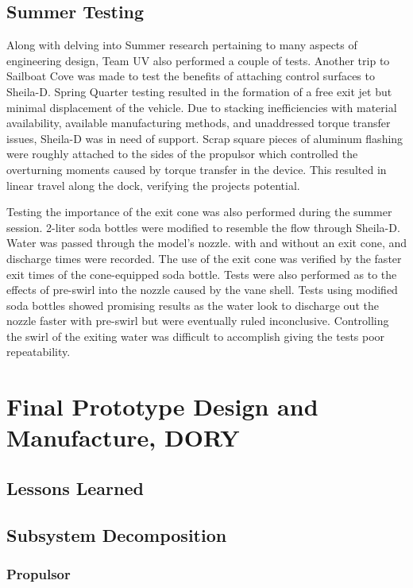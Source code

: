\documentclass{report}
\begin{document}
\section{Summer Testing}
Along with delving into Summer research pertaining to many aspects of engineering design, Team UV also performed a couple of tests.  Another trip to Sailboat Cove was made to test the benefits of attaching control surfaces to Sheila-D.  Spring Quarter testing resulted in the formation of a free exit jet but minimal displacement of the vehicle.  Due to stacking inefficiencies with material availability, available manufacturing methods, and unaddressed torque transfer issues, Sheila-D was in need of support.  Scrap square pieces of aluminum flashing were roughly attached to the sides of the propulsor which controlled the overturning moments caused by torque transfer in the device.  This resulted in linear travel along the dock, verifying the projects potential.\par
Testing the importance of the exit cone was also performed during the summer session.  2-liter soda bottles were modified to resemble the flow through Sheila-D.  Water was passed through the model’s nozzle. with and without an exit cone, and discharge times were recorded.  The use of the exit cone was verified by the faster exit times of the cone-equipped soda bottle.  Tests were also performed as to the effects of pre-swirl into the nozzle caused by the vane shell.  Tests using modified soda bottles showed promising results as the water look to discharge out the nozzle faster with pre-swirl but were eventually ruled inconclusive.  Controlling the swirl of the exiting water was difficult to accomplish giving the tests poor repeatability.\\
\chapter{Final Prototype Design and Manufacture, DORY}
\section{Lessons Learned}
\section{Subsystem Decomposition}
\subsection{Propulsor}
\end{document}

